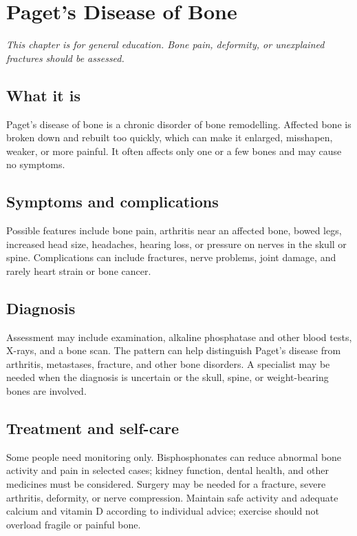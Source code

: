 \chapter{Paget's Disease of Bone}

\medskip
\noindent\textit{This chapter is for general education. Bone pain, deformity, or unexplained fractures should be assessed.}

\section*{What it is}
Paget's disease of bone is a chronic disorder of bone remodelling. Affected bone is broken down and rebuilt too quickly, which can make it enlarged, misshapen, weaker, or more painful. It often affects only one or a few bones and may cause no symptoms.

\section*{Symptoms and complications}
Possible features include bone pain, arthritis near an affected bone, bowed legs, increased head size, headaches, hearing loss, or pressure on nerves in the skull or spine. Complications can include fractures, nerve problems, joint damage, and rarely heart strain or bone cancer.

\section*{Diagnosis}
Assessment may include examination, alkaline phosphatase and other blood tests, X-rays, and a bone scan. The pattern can help distinguish Paget's disease from arthritis, metastases, fracture, and other bone disorders. A specialist may be needed when the diagnosis is uncertain or the skull, spine, or weight-bearing bones are involved.

\section*{Treatment and self-care}
Some people need monitoring only. Bisphosphonates can reduce abnormal bone activity and pain in selected cases; kidney function, dental health, and other medicines must be considered. Surgery may be needed for a fracture, severe arthritis, deformity, or nerve compression. Maintain safe activity and adequate calcium and vitamin D according to individual advice; exercise should not overload fragile or painful bone.

